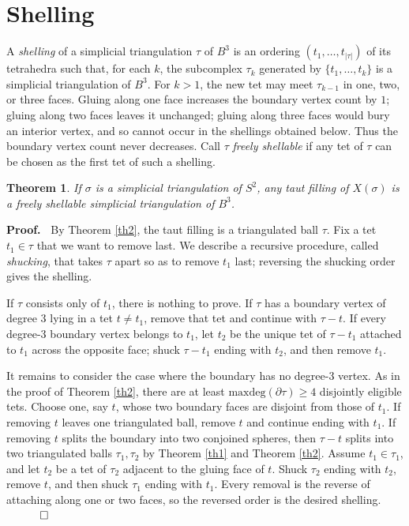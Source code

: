 \documentclass[12pt]{article}
\newtheorem{theorem}{Theorem}
\newcommand{\proofstart}{{\noindent \bf Proof.\ }}
\newcommand{\proofend}{$\quad \qed$}
\newcommand{\kw}{\mathrm}
\newcommand{\maxdeg}{\kw{maxdeg}}
\begin{document}
\section{Shelling}

A \emph{shelling} of a simplicial triangulation $\tau$ of $B^3$
is an ordering
$(t_1,\ldots,t_{|\tau|})$
of its tetrahedra such that, for each $k$,
the subcomplex $\tau_k$ generated by $\{t_1,\ldots,t_k\}$ is a
simplicial triangulation of $B^3$.
For $k>1$, the new tet may meet $\tau_{k-1}$ in one, two, or three
faces. Gluing along one face increases the boundary vertex count by $1$;
gluing along two faces leaves it unchanged; gluing along three faces
would bury an interior vertex, and so cannot occur in the shellings
obtained below. Thus the boundary vertex count never decreases.
Call $\tau$ \emph{freely shellable} if any tet of $\tau$ can be chosen as
the first tet of such a shelling.

\begin{theorem} \label{th3}
If $\sigma$ is a simplicial triangulation of $S^2$,
any taut filling of $X(\sigma)$ is a freely shellable
simplicial triangulation of $B^3$.
\end{theorem}

\proofstart
By Theorem \ref{th2}, the taut filling is a triangulated ball $\tau$.
Fix a tet $t_1 \in \tau$ that we want to remove last.  We describe a
recursive procedure, called \emph{shucking}, that takes $\tau$ apart
so as to remove $t_1$ last; reversing the shucking order gives the
shelling.

If $\tau$ consists only of $t_1$, there is nothing to prove.
If $\tau$ has a boundary vertex of degree $3$ lying in a tet
$t\ne t_1$, remove that tet and continue with $\tau-t$.
If every degree-$3$ boundary vertex belongs to $t_1$, let $t_2$ be the
unique tet of $\tau-t_1$ attached to $t_1$ across the opposite face;
shuck $\tau-t_1$ ending with $t_2$, and then remove $t_1$.

It remains to consider the case where the boundary has no degree-$3$
vertex.  As in the proof of Theorem \ref{th2}, there are at least
$\maxdeg(\partial \tau)\geq 4$ disjointly eligible tets.
Choose one, say $t$, whose two boundary faces are disjoint from those of
$t_1$.
If removing $t$ leaves one triangulated ball, remove $t$ and continue
ending with $t_1$.
If removing $t$ splits the boundary into two conjoined spheres, then
$\tau-t$ splits into two triangulated balls $\tau_1,\tau_2$ by
Theorem \ref{th1} and Theorem \ref{th2}.
Assume $t_1\in \tau_1$, and let $t_2$ be a tet of $\tau_2$ adjacent to
the gluing face of $t$.
Shuck $\tau_2$ ending with $t_2$, remove $t$, and then shuck
$\tau_1$ ending with $t_1$.
Every removal is the reverse of attaching along one or two faces, so the
reversed order is the desired shelling.
\proofend
\end{document}
